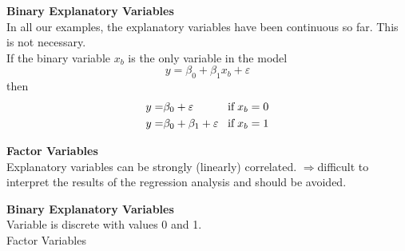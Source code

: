 \textbf{Binary Explanatory Variables}\\
In all our examples, the explanatory variables have been continuous so far. This is not necessary.\\
If the binary variable $x_b$ is the only variable in the model
\begin{equation}
  y = \beta_0 + \beta_1 x_b + \varepsilon
\end{equation}
then
\begin{equation}
  \begin{split}
    y =& \beta_0 + \varepsilon\\
    y =& \beta_0 + \beta_1 + \varepsilon
  \end{split}
  \;\;\;
  \begin{split}
    \textup{if}\; x_b = 0\\
    \textup{if}\; x_b = 1
  \end{split}
\end{equation}

\textbf{Factor Variables}\\
Explanatory variables can be strongly (linearly) correlated.
$\Rightarrow$difficult to interpret the results of the regression analysis and
should be avoided.





\textbf{Binary Explanatory Variables}\\
Variable is discrete with values 0 and 1.\\

Factor Variables
